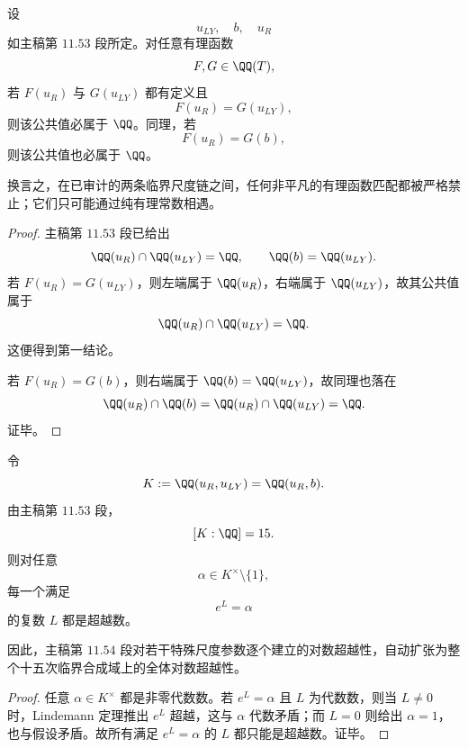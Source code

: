 \begin{theorem}\label{thm:conclusion-critical-scales-rational-function-decoupling}
设
\[
u_{LY},\quad b,\quad u_R
\]
如主稿第 \(11.53\) 段所定。对任意有理函数
\[
F,G\in \QQ(T),
\]
若 \(F(u_R)\) 与 \(G(u_{LY})\) 都有定义且
\[
F(u_R)=G(u_{LY}),
\]
则该公共值必属于 \(\QQ\)。同理，若
\[
F(u_R)=G(b),
\]
则该公共值也必属于 \(\QQ\)。

换言之，在已审计的两条临界尺度链之间，任何非平凡的有理函数匹配都被严格禁止；它们只可能通过纯有理常数相遇。
\end{theorem}
\begin{proof}
主稿第 \(11.53\) 段已给出
\[
\QQ(u_R)\cap \QQ(u_{LY})=\QQ,
\qquad
\QQ(b)=\QQ(u_{LY}).
\]
若 \(F(u_R)=G(u_{LY})\)，则左端属于 \(\QQ(u_R)\)，右端属于 \(\QQ(u_{LY})\)，故其公共值属于
\[
\QQ(u_R)\cap \QQ(u_{LY})=\QQ.
\]
这便得到第一结论。

若 \(F(u_R)=G(b)\)，则右端属于 \(\QQ(b)=\QQ(u_{LY})\)，故同理也落在
\[
\QQ(u_R)\cap \QQ(b)=\QQ(u_R)\cap \QQ(u_{LY})=\QQ.
\]
证毕。
\end{proof}

\begin{corollary}[十五次临界合成域上的对数全体超越性]\label{cor:conclusion-critical-degree-fifteen-compositum-log-transcendence}
令
\[
K:=\QQ(u_R,u_{LY})=\QQ(u_R,b).
\]
由主稿第 \(11.53\) 段，
\[
[K:\QQ]=15.
\]
则对任意
\[
\alpha\in K^\times\setminus\{1\},
\]
每一个满足
\[
e^L=\alpha
\]
的复数 \(L\) 都是超越数。

因此，主稿第 \(11.54\) 段对若干特殊尺度参数逐个建立的对数超越性，自动扩张为整个十五次临界合成域上的全体对数超越性。
\end{corollary}
\begin{proof}
任意 \(\alpha\in K^\times\) 都是非零代数数。若 \(e^L=\alpha\) 且 \(L\) 为代数数，则当 \(L\neq0\) 时，Lindemann 定理推出 \(e^L\) 超越，这与 \(\alpha\) 代数矛盾；而 \(L=0\) 则给出 \(\alpha=1\)，也与假设矛盾。故所有满足 \(e^L=\alpha\) 的 \(L\) 都只能是超越数。证毕。
\end{proof}

